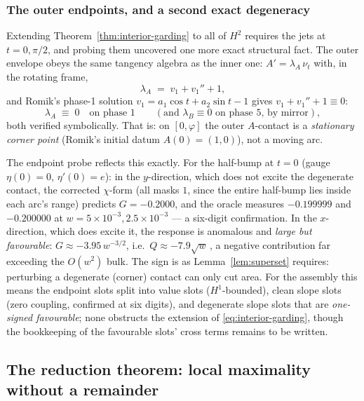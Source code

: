\documentclass[11pt]{amsart}
\theoremstyle{plain}
\theoremstyle{definition}
\begin{document}
\subsubsection*{The outer endpoints, and a second exact degeneracy}

Extending Theorem~\ref{thm:interior-garding} to all of $H^{2}$ requires
the jets at $t=0,\pi/2$, and probing them uncovered one more exact
structural fact.  The outer envelope obeys the same tangency algebra as
the inner one: $A' = \lambda_{A}\,\nu_{t}$ with, in the rotating frame,
\begin{equation}\label{eq:lamA}
   \lambda_{A} \;=\; v_{1} + v_{1}'' + 1 ,
\end{equation}
and Romik's phase-1 solution $v_{1} = a_{1}\cos t + a_{2}\sin t - 1$
gives $v_{1}+v_{1}''+1 \equiv 0$:
\begin{equation}\label{eq:lamA-zero}
   \lambda_{A} \;\equiv\; 0 \quad\text{on phase 1}
   \qquad(\text{and } \lambda_{B}\equiv0 \text{ on phase 5, by mirror}),
\end{equation}
both verified symbolically.  That is: on $[0,\varphi]$ the outer
$A$-contact is a \emph{stationary corner point} (Romik's initial datum
$A(0) = (1,0)$), not a moving arc.

The endpoint probe reflects this exactly.  For the half-bump at $t=0$
(gauge $\eta(0)=0$, $\eta'(0)=e$): in the $y$-direction, which does not
excite the degenerate contact, the corrected $\chi$-form (all masks
$1$, since the entire half-bump lies inside each arc's range) predicts
$G = -0.2000$, and the oracle measures $-0.199999$ and $-0.200000$ at
$w = 5\times10^{-3}, 2.5\times10^{-3}$ --- a six-digit confirmation.
In the $x$-direction, which does excite it, the response is anomalous
and \emph{large but favourable}: $G \approx -3.95\,w^{-3/2}$, i.e.\
$Q \approx -7.9\sqrt{w}\,$, a negative contribution far exceeding the
$O(w^{2})$ bulk.  The sign is as Lemma~\ref{lem:superset} requires:
perturbing a degenerate (corner) contact can only cut area.  For the
assembly this means the endpoint slots split into value slots
($H^{1}$-bounded), clean slope slots (zero coupling, confirmed at six
digits), and degenerate slope slots that are \emph{one-signed
favourable}; none obstructs the extension of
\eqref{eq:interior-garding}, though the bookkeeping of the favourable
slots' cross terms remains to be written.

\subsection{The reduction theorem: local maximality without a remainder}
\label{sec:reduction}
\end{document}
